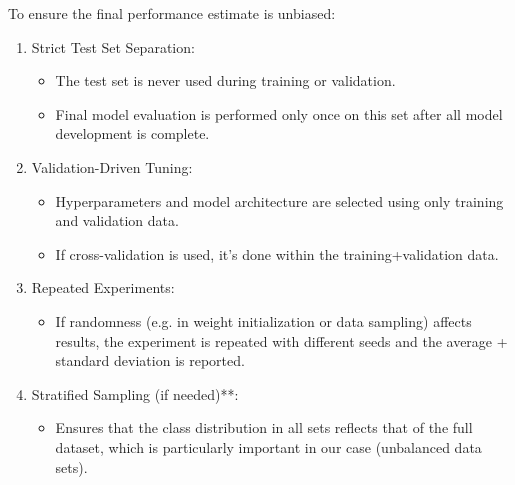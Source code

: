 To ensure the final performance estimate is unbiased:

\begin{enumerate}
	\item Strict Test Set Separation:
	\begin{itemize}
		\item The test set is never used during training or validation.
		\item Final model evaluation is performed only once on this set after all model development is complete.
	\end{itemize}
	
	\item Validation-Driven Tuning:
	\begin{itemize}
		\item Hyperparameters and model architecture are selected using only training and validation data.
		\item If cross-validation is used, it’s done within the training+validation data.
	\end{itemize}
	
	\item Repeated Experiments:
	\begin{itemize}
		\item If randomness (e.g. in weight initialization or data sampling) affects results, 
			the experiment is repeated with different seeds and the average + standard deviation is reported.
	\end{itemize}

	\item Stratified Sampling (if needed)**:
	\begin{itemize}
		\item Ensures that the class distribution in all sets reflects that of the full dataset, which is particularly important in our case (unbalanced data sets).
	\end{itemize}
\end{enumerate}




